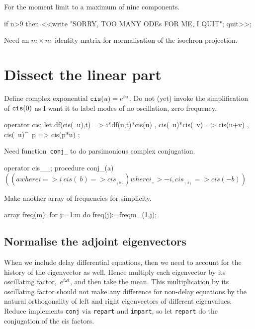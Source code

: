 \documentclass[11pt,a5paper]{article}
\begin{document}
For the moment limit to a maximum of nine components.
\begin{reduce}
if n>9 then <<write "SORRY, TOO MANY ODEs FOR ME, I QUIT"; 
    quit>>;
\end{reduce}

Need an \(m\times m\)~identity matrix for normalisation of the isochron projection.


\section{Dissect the linear part}

Define complex exponential $\verb|cis|(u)=e^{iu}$.
Do not (yet) invoke the simplification of $\verb|cis|(0)$ as I want it to label modes of no oscillation, zero frequency.

\begin{reduce}
operator cis;
let { df(cis(~u),t) => i*df(u,t)*cis(u)
    , cis(~u)*cis(~v) => cis(u+v)
    , cis(~u)^~p => cis(p*u)
    };
\end{reduce}

Need function~\verb|conj_| to do parsimonious complex conjugation.
\begin{reduce}
operator cis__;
procedure conj_(a)$    
    ((a where {i=>i__, cis(~b)=>cis__(b) })
        where {i__=>-i,cis__(~b)=>cis(-b)})$
\end{reduce}

Make another array of frequencies for simplicity.

\begin{reduce}
array freq(m);
for j:=1:m do freq(j):=freqm_(1,j);
\end{reduce}



\subsection{Normalise the adjoint eigenvectors}
When we include delay differential equations, then we need to account for the history of the eigenvector as well.
Hence multiply each eigenvector by its oscillating factor,~\(e^{i\omega t}\), and then take the mean.
This multiplication by its oscillating factor should not make any difference for non-delay equations by the natural orthogonality of left and right eigenvectors of different eigenvalues.
Reduce implements \verb|conj| via \verb|repart| and \verb|impart|, so let \verb|repart| do the conjugation of the cis factors.
\end{document}
